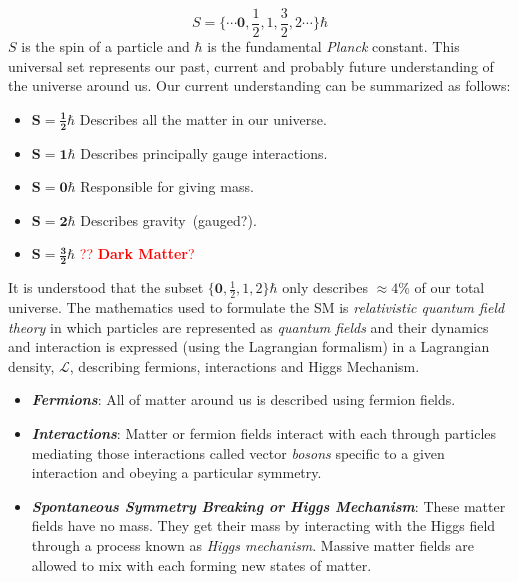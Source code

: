 \begin{equation*}
S =\{ \cdots \mathbf{0}, \frac{1}{2}, 1,  \frac{3}{2}, 2  \cdots \}\hbar 
\end{equation*}
 $S$ is the spin of a particle and $\hbar$ is the fundamental \textit{Planck} constant. 
 This universal set represents our past, current and probably future understanding of the universe around us. Our current understanding can be summarized as follows:
 \begin{itemize}
  \item $\mathbf{S = \frac{1}{2}\hbar}$ Describes all the matter in our universe.
  \item $\mathbf{S = 1\hbar}$ Describes principally gauge interactions.
  \item $\mathbf{S = 0\hbar}$ Responsible for giving mass.
  \item $\mathbf{S = 2\hbar}$ Describes gravity~(gauged?).
  \item $\mathbf{S = \frac{3}{2}\hbar}$ \textcolor{red}{?? \textbf{Dark Matter}?}
 \end{itemize}
It is understood that the subset $\{\mathbf{0}, \frac{1}{2}, 1, 2 \}\hbar$ only describes $\approx 4$\% of our total universe.
\newline
The mathematics used to formulate the SM is \textit{relativistic quantum field theory} in which particles are represented as \textit{quantum fields} and their dynamics and interaction is expressed (using the Lagrangian formalism) in a Lagrangian density, $\mathcal{L}$, describing fermions, interactions and Higgs Mechanism.

\begin{itemize}
\item \textbf{\textit{Fermions}}: All of matter around us is described using fermion fields.
\item \textbf{\textit{Interactions}}: Matter or fermion fields interact with each  through particles mediating those interactions called vector \textit{bosons} specific to a given interaction and obeying a particular symmetry.
\item \textbf{\textit{Spontaneous Symmetry Breaking or Higgs Mechanism}}: These matter fields have no mass. They get their mass by interacting with the Higgs field through a process known as \textit{Higgs mechanism}. Massive matter fields are allowed to mix with each forming new states of matter.

\end{itemize}
